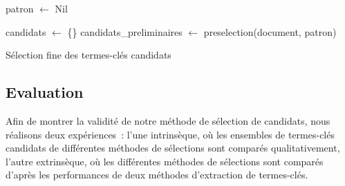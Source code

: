         \begin{algorithm}[h!]
          \DontPrintSemicolon{}

          \BlankLine

          patron $\leftarrow$ Nil\;\label{algo:line:start_preselection}

          candidats $\leftarrow$ \{\}\;
          candidats\_preliminaires $\leftarrow$ preselection(document, patron)\;\label{algo:line:end_preselection}

          \label{algo:line:end_filtering}


          \caption{Sélection fine des termes-clés candidats
                   \label{algo:candidate_pruning}}
        \end{algorithm}

    \subsection{Evaluation}
    \label{subsec:main-automatic_keyphrase_annotation-keyphrase_candidate_selection-evaluation}
      Afin de montrer la validité de notre méthode de sélection de candidats,
      nous réalisons deux expériences~: l'une intrinsèque, où les ensembles de
      termes-clés candidats de différentes méthodes de sélections sont comparés
      qualitativement, l'autre extrinsèque, où les différentes méthodes de
      sélections sont comparés d'après les performances de deux méthodes
      d'extraction de termes-clés.

